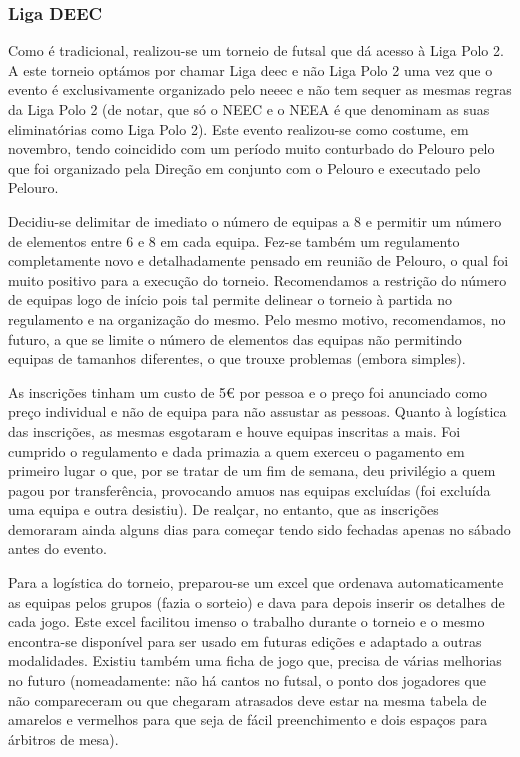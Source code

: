 
\subsubsection{Liga DEEC}

Como é tradicional, realizou-se um torneio de futsal que dá acesso à Liga Polo 2. A este torneio optámos por chamar Liga \acrshort{deec} e não Liga Polo 2 uma vez que o evento é exclusivamente organizado pelo \acrshort{neeec} e não tem sequer as mesmas regras da Liga Polo 2 (de notar, que só o NEEC e o NEEA é que denominam as suas eliminatórias como Liga Polo 2). Este evento realizou-se como costume, em novembro, tendo coincidido com um período muito conturbado do Pelouro pelo que foi organizado pela Direção em conjunto com o Pelouro e executado pelo Pelouro.

Decidiu-se delimitar de imediato o número de equipas a 8 e permitir um número de elementos entre 6 e 8 em cada equipa. Fez-se também um regulamento completamente novo e detalhadamente pensado em reunião de Pelouro, o qual foi muito positivo para a execução do torneio. Recomendamos a restrição do número de equipas logo de início pois tal permite delinear o torneio à partida no regulamento e na organização do mesmo. Pelo mesmo motivo, recomendamos, no futuro, a que se limite o número de elementos das equipas não permitindo equipas de tamanhos diferentes, o que trouxe problemas (embora simples).

As inscrições tinham um custo de 5€ por pessoa e o preço foi anunciado como preço individual e não de equipa para não assustar as pessoas. Quanto à logística das inscrições, as mesmas esgotaram e houve equipas inscritas a mais. Foi cumprido o regulamento e dada primazia a quem exerceu o pagamento em primeiro lugar o que, por se tratar de um fim de semana, deu privilégio a quem pagou por transferência, provocando amuos nas equipas excluídas (foi excluída uma equipa e outra desistiu). De realçar, no entanto, que as inscrições demoraram ainda alguns dias para começar tendo sido fechadas apenas no sábado antes do evento.

Para a logística do torneio, preparou-se um excel que ordenava automaticamente as equipas pelos grupos (fazia o sorteio) e dava para depois inserir os detalhes de cada jogo. Este excel facilitou imenso o trabalho durante o torneio e o mesmo encontra-se disponível para ser usado em futuras edições e adaptado a outras modalidades. Existiu também uma ficha de jogo que, precisa de várias melhorias no futuro (nomeadamente: não há cantos no futsal, o ponto dos jogadores que não compareceram ou que chegaram atrasados deve estar na mesma tabela de amarelos e vermelhos para que seja de fácil preenchimento e dois espaços para árbitros de mesa).

